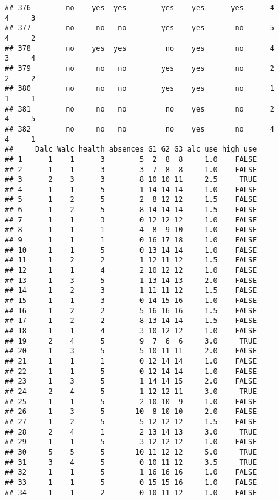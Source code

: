 \documentclass[]{article}
\begin{document}
\begin{verbatim}
## 376        no    yes  yes        yes    yes      yes      4        4     3
## 377        no     no   no        yes    yes       no      5        4     2
## 378        no    yes  yes         no    yes       no      4        3     4
## 379        no     no   no        yes    yes       no      2        2     2
## 380        no     no   no        yes    yes       no      1        1     1
## 381        no     no   no         no    yes       no      2        4     5
## 382        no     no   no         no    yes       no      4        4     1
##     Dalc Walc health absences G1 G2 G3 alc_use high_use
## 1      1    1      3        5  2  8  8     1.0    FALSE
## 2      1    1      3        3  7  8  8     1.0    FALSE
## 3      2    3      3        8 10 10 11     2.5     TRUE
## 4      1    1      5        1 14 14 14     1.0    FALSE
## 5      1    2      5        2  8 12 12     1.5    FALSE
## 6      1    2      5        8 14 14 14     1.5    FALSE
## 7      1    1      3        0 12 12 12     1.0    FALSE
## 8      1    1      1        4  8  9 10     1.0    FALSE
## 9      1    1      1        0 16 17 18     1.0    FALSE
## 10     1    1      5        0 13 14 14     1.0    FALSE
## 11     1    2      2        1 12 11 12     1.5    FALSE
## 12     1    1      4        2 10 12 12     1.0    FALSE
## 13     1    3      5        1 13 14 13     2.0    FALSE
## 14     1    2      3        1 11 11 12     1.5    FALSE
## 15     1    1      3        0 14 15 16     1.0    FALSE
## 16     1    2      2        5 16 16 16     1.5    FALSE
## 17     1    2      2        8 13 14 14     1.5    FALSE
## 18     1    1      4        3 10 12 12     1.0    FALSE
## 19     2    4      5        9  7  6  6     3.0     TRUE
## 20     1    3      5        5 10 11 11     2.0    FALSE
## 21     1    1      1        0 12 14 14     1.0    FALSE
## 22     1    1      5        0 12 14 14     1.0    FALSE
## 23     1    3      5        1 14 14 15     2.0    FALSE
## 24     2    4      5        1 12 12 11     3.0     TRUE
## 25     1    1      5        2 10 10  9     1.0    FALSE
## 26     1    3      5       10  8 10 10     2.0    FALSE
## 27     1    2      5        5 12 12 12     1.5    FALSE
## 28     2    4      1        2 13 14 13     3.0     TRUE
## 29     1    1      5        3 12 12 12     1.0    FALSE
## 30     5    5      5       10 11 12 12     5.0     TRUE
## 31     3    4      5        0 10 11 12     3.5     TRUE
## 32     1    1      5        1 16 16 16     1.0    FALSE
## 33     1    1      5        0 15 15 16     1.0    FALSE
## 34     1    1      2        0 10 11 12     1.0    FALSE

\end{verbatim}
\end{document}
